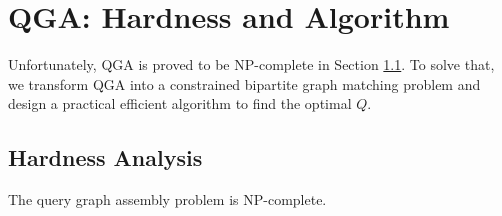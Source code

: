 \section{QGA: Hardness and Algorithm}
\label{sec:querygraphassembling}
Unfortunately, QGA is proved to be NP-complete in Section \ref{sec:hardness}. To solve that, we transform QGA into a constrained bipartite graph matching problem and design a practical efficient algorithm to find the optimal $Q$.  

\subsection{Hardness Analysis}\label{sec:hardness}

\begin{theorem}
	The query graph assembly problem is NP-complete.
\end{theorem}

